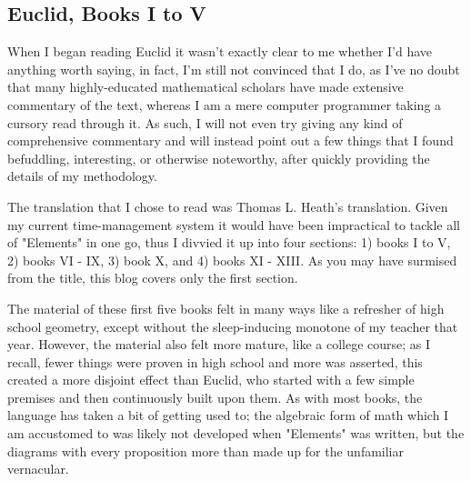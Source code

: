 \documentclass{article}
\begin{document}
\subsection{Euclid, Books I to V}
When I began reading Euclid it wasn't exactly clear to me whether I'd have anything worth saying, in fact, I'm still not convinced that I do, as I've no doubt that many highly-educated mathematical scholars have made extensive commentary of the text, whereas I am a mere computer programmer taking a cursory read through it.  As such, I will not even try giving any kind of comprehensive commentary and will instead point out a few things that I found befuddling, interesting, or otherwise noteworthy, after quickly providing the details of my methodology.

The translation that I chose to read was Thomas L. Heath's translation.  Given my current time-management system it would have been impractical to tackle all of "Elements" in one go, thus I divvied it up into four sections: 1) books I to V, 2) books VI - IX, 3) book X, and 4) books XI - XIII.  As you may have surmised from the title, this blog covers only the first section.

The material of these first five books felt in many ways like a refresher of high school geometry, except without the sleep-inducing monotone of my teacher that year.  However, the material also felt more mature, like a college course; as I recall, fewer things were proven in high school and more was asserted, this created a more disjoint effect than Euclid, who started with a few simple premises and then continuously built upon them.  As with most books, the language has taken a bit of getting used to; the algebraic form of math which I am accustomed to was likely not developed when "Elements" was written, but the diagrams with every proposition more than made up for the unfamiliar vernacular.
\end{document}
